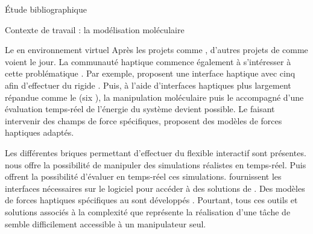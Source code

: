 \documentclass[myfrancais,ngerman,english,frenchb]{mythesis}
\begin{document}
\begin{mychapter}{Étude bibliographique}
\begin{mysection}{Contexte de travail : la modélisation moléculaire}
\begin{mysubsection}{Le  en environnement virtuel}
				Après les projets comme \myGROPE, d'autres projets de  comme \mySTALK {} voient le jour.
				La communauté haptique commence également à s'intéresser à cette problématique .
				Par exemple,  proposent une interface haptique avec cinq  afin d'effectuer du  rigide  .
				Puis, à l'aide d'interfaces haptiques plus largement répandue comme le \myVirtuose (six ), la manipulation moléculaire  puis le   accompagné d'une évaluation temps-réel de l'énergie du système devient possible.
				Le  faisant intervenir des champs de force spécifiques,  proposent des modèles de forces haptiques adaptés.

				\begin{myfigure}
				\end{myfigure}

				Les différentes briques permettant d'effectuer du  flexible interactif sont présentes.
				 nous offre la possibilité de manipuler des simulations réalistes en temps-réel.
				Puis  offrent la possibilité d'évaluer en temps-réel ces simulations.
				 fournissent les interfaces nécessaires sur le logiciel  pour accéder à des solutions de .
				Des modèles de forces haptiques spécifiques au  sont développés .
				Pourtant, tous ces outils et solutions associés à la complexité que représente la réalisation d'une tâche de  semble difficilement accessible à un manipulateur seul.


\end{mysubsection}
\end{mysection}
\end{mychapter}
\end{document}
